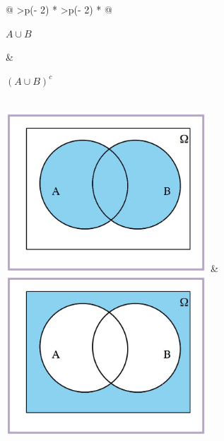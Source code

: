 \documentclass[
  letterpaper,
  DIV=11,
  numbers=noendperiod]{scrreprt}
\begin{document}
\begin{longtable}[]{@{}
  >{\centering\arraybackslash}p{(\columnwidth - 2\tabcolsep) * }
  >{\centering\arraybackslash}p{(\columnwidth - 2\tabcolsep) * }@{}}
\toprule\noalign{}
\begin{minipage}[b]{\linewidth}\centering
\(A\cup B\)
\end{minipage} & \begin{minipage}[b]{\linewidth}\centering
\((A\cup B)^c\)
\end{minipage} \\
\midrule\noalign{}
\endhead
\bottomrule\noalign{}
\endlastfoot
\includegraphics[width=\textwidth,height=6cm]{Images/proba1dibujos/demorgan6.jpg}
&
\includegraphics[width=\textwidth,height=6cm]{Images/proba1dibujos/demorgan7.jpg} \\
\end{longtable}
\end{document}
